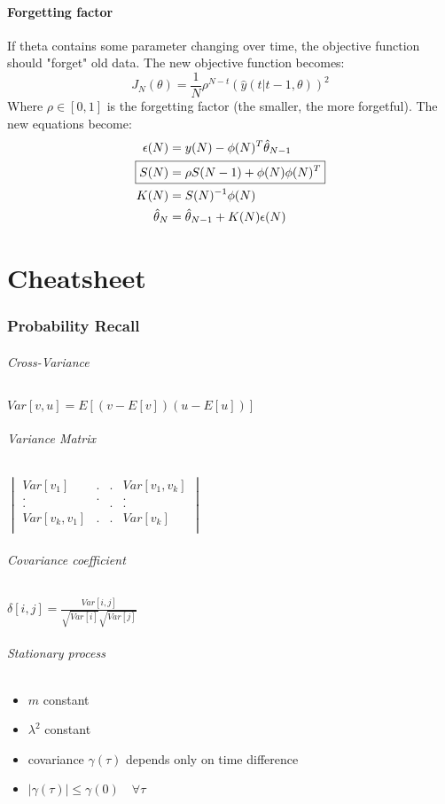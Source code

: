\documentclass{article}
\let\OldPart\part
\renewcommand{\part}{\newpage\OldPart}
\begin{document}
\subsection{Forgetting factor}
If theta contains some parameter changing over time, the objective function should "forget" old data. The new objective function becomes:
\[
J_N(\theta)=\frac{1}{N}
\rho^{N-t}\left(\hat{y}(t|t-1,\theta)\right)^2
\]
Where $\rho\in\left[0,1\right]$ is the forgetting factor (the smaller, the more forgetful). The new equations become:
\begin{align*}
\epsilon(N)&=y(N)-\phi(N)^T\hat{\theta}_{N-1}\\
\Aboxed{
S(N)&=\rho S(N-1)+\phi(N)\phi(N)^T
}\\
K(N)&=S(N)^{-1}\phi(N)\\
\hat{\theta}_N&=\hat{\theta}_{N-1}+K(N)\epsilon(N)
\end{align*}

\newpage
\appendix
\part{Cheatsheet}
\section{Probability Recall}
\paragraph{Cross-Variance}
$Var[v,u]=E[(v-E[v])(u-E[u])]$
\paragraph{Variance Matrix}
$\begin{vmatrix}
	Var[v_1]			&	.	&	.	&	Var[v_1,v_k]		\\
		.			&	.	&		&		.			\\
		.			&		&	.	&		.			\\
	Var[v_k,v_1]		&	.	&	.	&	Var[v_k]			\\
				
\end{vmatrix}$
\paragraph{Covariance coefficient}
	$\delta[i,j]=\frac{Var[i,j]}{\sqrt{Var[i]}\sqrt{Var[j]}}$
\paragraph{Stationary process}
\begin{itemize}
	\item $m$ constant
	\item $\lambda^2$ constant
	\item covariance $\gamma(\tau)$ depends only on time difference
	\item $|\gamma(\tau)|\leq\gamma(0)		\quad\forall\tau$
\end{itemize}
\end{document}
